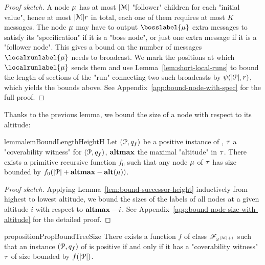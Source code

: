 \begin{proof}[Proof sketch]
	A node $\mu$ has at most $|\mathcal{M}|$ "follower" children for each "initial value", hence at most $|\mathcal{M}|r$ in total, each one of them requires at most $K$ messages. The node $\mu$ may have to output $\bosslabel{\node}$ extra messages to satisfy its "specification" if it is a "boss node", or just one extra message if it is a "follower node".
	This gives a bound on the number of messages $\localrunlabel{\node}$ needs to broadcast. We mark the positions at which $\localrunlabel{\node}$ sends them and use Lemma~\ref{lem:short-local-runs} to bound the length of sections of the "run" connecting two such broadcasts by $\psi(|\mathcal{P}|,r)$, which yields the bounds above. See Appendix~\ref{app:bound-node-with-spec} for the full proof.
\end{proof}

Thanks to the previous lemma, we bound the size of a node with respect to its altitude: 
\begin{restatable}{lemma}{lemBoundLengthHeightH}
	\label{lem:bound-length-at-height-h}
	Let $(\mathcal{P},q_f)$ be a positive instance of \COVER, $\tau$ a "coverability witness" for $(\mathcal{P},q_f)$, $\mathbf{altmax}$ the maximal "altitude" in $\tau$. There exists a primitive recursive function $f_0$ such that any node $\mu$ of $\tau$ has size bounded by $f_0(|\mathcal{P}| + \mathbf{altmax} - \mathbf{alt}(\mu))$.
\end{restatable}
\begin{proof}[Proof sketch]
Applying Lemma~\ref{lem:bound-successor-height} inductively from highest to lowest altitude, we bound the sizes of the labels of all nodes at a given altitude $i$ with respect to $\mathbf{altmax}-i$.
See Appendix~\ref{app:bound-node-size-with-altitude} for the detailed proof. 
\end{proof}
 
\begin{restatable}{proposition}{PropBoundTreeSize}
	\label{prop:bound-tree-size}
	There exists a function $f$ of class $\mathscr{F}_{\omega^{|\mathcal{M}|+1}}$ such that an instance $(\mathcal{P},q_f)$ of \COVER is positive if and only if it has a "coverability witness" $\tau$ of size bounded by $f(|\mathcal{P}|)$.
\end{restatable}


